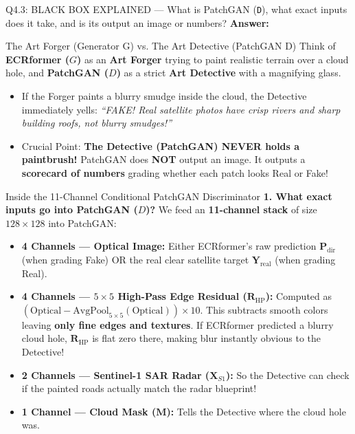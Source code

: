 \documentclass[11pt,a4paper]{article}
\begin{document}
\begin{qbox}{Q4.3: BLACK BOX EXPLAINED — What is PatchGAN (\texttt{D}), what exact inputs does it take, and is its output an image or numbers?}
\textbf{Answer:}
\begin{analogybox}{The Art Forger (Generator G) vs. The Art Detective (PatchGAN D)}
Think of \textbf{ECRformer ($G$)} as an \textbf{Art Forger} trying to paint realistic terrain over a cloud hole, and \textbf{PatchGAN ($D$)} as a strict \textbf{Art Detective} with a magnifying glass.
\begin{itemize}[leftmargin=18pt]
    \item If the Forger paints a blurry smudge inside the cloud, the Detective immediately yells: \textit{``FAKE! Real satellite photos have crisp rivers and sharp building roofs, not blurry smudges!''}
    \item Crucial Point: \textbf{The Detective (PatchGAN) NEVER holds a paintbrush!} PatchGAN does \textbf{NOT} output an image. It outputs a \textbf{scorecard of numbers} grading whether each patch looks Real or Fake!
\end{itemize}
\end{analogybox}

\begin{blackbox}{Inside the 11-Channel Conditional PatchGAN Discriminator}
\textbf{1. What exact inputs go into PatchGAN ($D$)?}
We feed an \textbf{11-channel stack} of size $128\times 128$ into PatchGAN:
\begin{itemize}[leftmargin=18pt]
    \item \textbf{4 Channels — Optical Image:} Either ECRformer's raw prediction $\mathbf{P}_{\text{dir}}$ (when grading Fake) OR the real clear satellite target $\mathbf{Y}_{\text{real}}$ (when grading Real).
    \item \textbf{4 Channels — $5\times 5$ High-Pass Edge Residual ($\mathbf{R}_{\text{HP}}$):} Computed as $(\text{Optical} - \text{AvgPool}_{5\times 5}(\text{Optical})) \times 10$. This subtracts smooth colors leaving \textbf{only fine edges and textures}. If ECRformer predicted a blurry cloud hole, $\mathbf{R}_{\text{HP}}$ is flat zero there, making blur instantly obvious to the Detective!
    \item \textbf{2 Channels — Sentinel-1 SAR Radar ($\mathbf{X}_{S1}$):} So the Detective can check if the painted roads actually match the radar blueprint!
    \item \textbf{1 Channel — Cloud Mask ($\mathbf{M}$):} Tells the Detective where the cloud hole was.
\end{itemize}


\end{blackbox}
\end{qbox}
\end{document}
